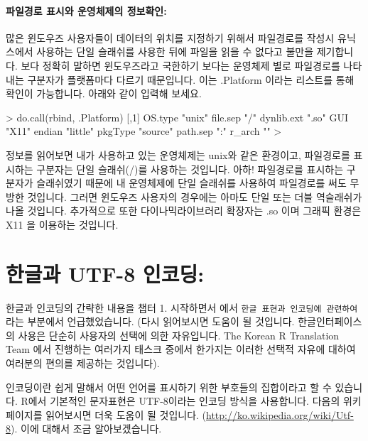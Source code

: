 \paragraph{파일경로 표시와 운영체제의 정보확인: }

많은 윈도우즈 사용자들이 데이터의 위치를 지정하기 위해서 파일경로를 작성시 유닉스에서 사용하는 단일 슬래쉬를 사용한 뒤에 파일을 읽을 수 없다고 불만을 제기합니다. 
보다 정확히 말하면 윈도우즈라고 국한하기 보다는 운영체제 별로 파일경로를 나타내는 구분자가 플랫폼마다 다르기 때문입니다. 
이는 .Platform 이라는 리스트를 통해 확인이 가능합니다. 
아래와 같이 입력해 보세요.

\begin{Schunk}
\begin{Soutput}
> do.call(rbind, .Platform)
           [,1]    
OS.type    "unix"  
file.sep   "/"     
dynlib.ext ".so"   
GUI        "X11"   
endian     "little"
pkgType    "source"
path.sep   ":"     
r_arch     ""      
> 
\end{Soutput}
\end{Schunk}

정보를 읽어보면 내가 사용하고 있는 운영체제는 unix와 같은 환경이고, 파일경로를 표시하는 구분자는 단일 슬래쉬(/)를 사용하는 것입니다.
아하! 파일경로를 표시하는 구분자가 슬래쉬였기 때문에 내 운영체제에 단일 슬래쉬를 사용하여 파일경로를 써도 무방한 것입니다.
그러면 윈도우즈 사용자의 경우에는 아마도 단일 또는 더블 역슬래쉬가 나올 것입니다.
추가적으로 또한 다이나믹라이브러리 확장자는 .so 이며 그래픽 환경은 X11 을 이용하는 것입니다. 


\section{한글과 UTF-8 인코딩:} 

한글과 인코딩의 간략한 내용을 챕터 1. 시작하면서 에서 \texttt{한글 표현과 인코딩에 관련하여} 라는 부분에서 언급했었습니다.
(다시 읽어보시면 도움이 될 것입니다.
한글인터페이스의 사용은 단순히 사용자의 선택에 의한 자유입니다.
The Korean R Translation Team 에서 진행하는 여러가지 태스크 중에서 한가지는 이러한 선택적 자유에 대하여 여러분의 편의를 제공하는 것입니다).

인코딩이란 쉽게 말해서 어떤 언어를 표시하기 위한 부호들의 집합이라고 할 수 있습니다.
R에서 기본적인 문자표현은 UTF-8이라는 인코딩 방식을 사용합니다.
다음의 위키페이지를 읽어보시면 더욱 도움이 될 것입니다. (\href{http://ko.wikipedia.org/wiki/Utf-8}{http://ko.wikipedia.org/wiki/Utf-8}).
이에 대해서 조금 알아보겠습니다.


